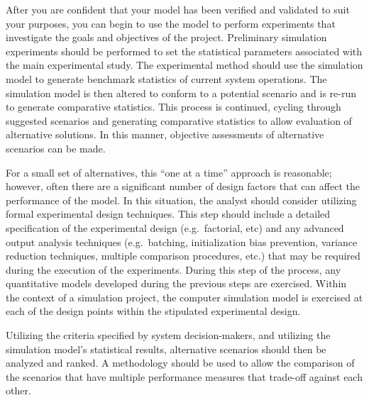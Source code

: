 \documentclass[
]{book}
\theoremstyle{definition}
\theoremstyle{definition}
\theoremstyle{definition}
\theoremstyle{definition}
\theoremstyle{remark}
\begin{document}
After you are confident that your model has been verified and validated
to suit your purposes, you can begin to use the model to perform
experiments that investigate the goals and objectives of the project.
Preliminary simulation experiments should be performed to set the
statistical parameters associated with the main experimental study. The
experimental method should use the simulation model to generate
benchmark statistics of current system operations. The simulation model
is then altered to conform to a potential scenario and is re-run to
generate comparative statistics. This process is continued, cycling
through suggested scenarios and generating comparative statistics to
allow evaluation of alternative solutions. In this manner, objective
assessments of alternative scenarios can be made.

For a small set of alternatives, this ``one at a time'' approach is
reasonable; however, often there are a significant number of design
factors that can affect the performance of the model. In this situation,
the analyst should consider utilizing formal experimental design
techniques. This step should include a detailed specification of the
experimental design (e.g.~factorial, etc) and any advanced output
analysis techniques (e.g.~batching, initialization bias prevention,
variance reduction techniques, multiple comparison procedures, etc.)
that may be required during the execution of the experiments. During
this step of the process, any quantitative models developed during the
previous steps are exercised. Within the context of a simulation
project, the computer simulation model is exercised at each of the
design points within the stipulated experimental design.

Utilizing the criteria specified by system decision-makers, and
utilizing the simulation model's statistical results, alternative
scenarios should then be analyzed and ranked. A methodology should be
used to allow the comparison of the scenarios that have multiple
performance measures that trade-off against each other.
\end{document}
